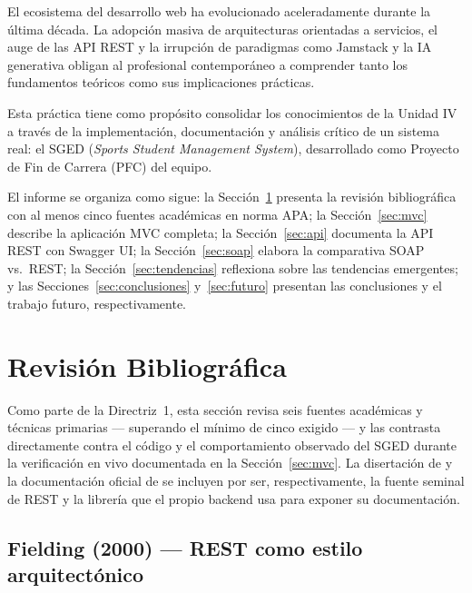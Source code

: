\documentclass[12pt,a4paper]{article}
\begin{document}
El ecosistema del desarrollo web ha evolucionado aceleradamente durante la última década.
La adopción masiva de arquitecturas orientadas a servicios, el auge de las API REST y la irrupción
de paradigmas como Jamstack y la IA generativa obligan al profesional contemporáneo a comprender
tanto los fundamentos teóricos como sus implicaciones prácticas.

Esta práctica tiene como propósito consolidar los conocimientos de la Unidad IV a través de la
implementación, documentación y análisis crítico de un sistema real: el SGED
(\textit{Sports Student Management System}), desarrollado como Proyecto de Fin de Carrera (PFC)
del equipo.

El informe se organiza como sigue: la Sección~\ref{sec:biblio} presenta la revisión bibliográfica
con al menos cinco fuentes académicas en norma APA; la Sección~\ref{sec:mvc} describe la
aplicación MVC completa; la Sección~\ref{sec:api} documenta la API REST con Swagger UI;
la Sección~\ref{sec:soap} elabora la comparativa SOAP vs.\ REST; la Sección~\ref{sec:tendencias}
reflexiona sobre las tendencias emergentes; y las Secciones~\ref{sec:conclusiones}
y~\ref{sec:futuro} presentan las conclusiones y el trabajo futuro, respectivamente.

\section{Revisión Bibliográfica}
\label{sec:biblio}

Como parte de la Directriz~1, esta sección revisa seis fuentes académicas y técnicas primarias
--- superando el mínimo de cinco exigido --- y las contrasta directamente contra el código y el
comportamiento observado del SGED durante la verificación en vivo documentada en la
Sección~\ref{sec:mvc}. La disertación de \textcite{fielding2000} y la documentación oficial de
\textcite{springdoc2024} se incluyen por ser, respectivamente, la fuente seminal de REST y la
librería que el propio backend usa para exponer su documentación.

\subsection{Fielding (2000) --- REST como estilo arquitectónico}
\end{document}
